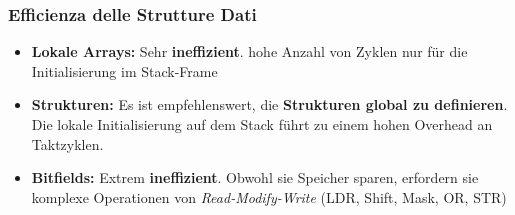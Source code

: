 \subsubsection{Efficienza delle Strutture Dati}
\begin{itemize}
    \item \textbf{Lokale Arrays:} Sehr \textbf{ineffizient}. 
    hohe Anzahl von Zyklen nur für die Initialisierung im Stack-Frame 
    \item \textbf{Strukturen:} Es ist empfehlenswert, die \textbf{Strukturen global zu definieren}. Die lokale Initialisierung auf dem Stack führt zu einem hohen Overhead an Taktzyklen.
    \item \textbf{Bitfields:} Extrem \textbf{ineffizient}. 
    Obwohl sie Speicher sparen, erfordern sie komplexe Operationen von
     \textit{Read-Modify-Write} (LDR, Shift, Mask, OR, STR)
\end{itemize}